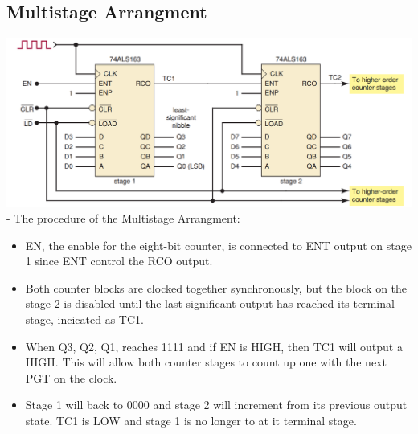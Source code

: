\documentclass[12pt]{article}
\begin{document}
\subsection{Multistage Arrangment}
\includegraphics[scale = 0.6]{hinh54}
- The procedure of the Multistage Arrangment: \\
\begin{itemize}
	\item EN, the enable for the eight-bit counter, is connected to ENT output on stage 1 since ENT control the RCO output.
	\item Both counter blocks are clocked together synchronously, but the block on the stage 2 is disabled until the last-significant output has reached its terminal stage, incicated as TC1.
	\item When Q3, Q2, Q1, reaches 1111 and if EN is HIGH, then TC1 will output a HIGH. This will allow both counter stages to count up one with the next PGT on the clock.
	\item Stage 1 will back to 0000 and stage 2 will increment from its previous output state. TC1 is LOW and stage 1 is no longer to at it terminal stage.
\end{itemize}
\end{document}
